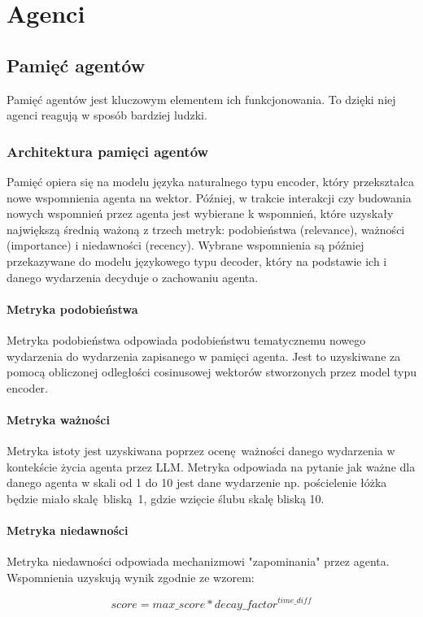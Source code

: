 \chapter{Agenci}

\section{Pamięć agentów}
Pamięć agentów jest kluczowym elementem ich funkcjonowania.
To dzięki niej agenci reagują w sposób bardziej ludzki.

\subsection{Architektura pamięci agentów}
Pamięć opiera się na modelu języka naturalnego typu encoder, który przekształca
nowe wspomnienia agenta na wektor. Później, w trakcie interakcji czy budowania nowych
wspomnień przez agenta jest wybierane k wspomnień, które uzyskały największą średnią
ważoną z trzech metryk: podobieństwa (relevance), ważności (importance) i niedawności (recency).
Wybrane wspomnienia są później przekazywane do modelu językowego typu decoder, który na
podstawie ich i danego wydarzenia decyduje o zachowaniu agenta.

\subsubsection{Metryka podobieństwa}
Metryka podobieństwa odpowiada podobieństwu tematycznemu nowego wydarzenia do
wydarzenia zapisanego w pamięci agenta. Jest to uzyskiwane za pomocą obliczonej
odległości cosinusowej wektorów stworzonych przez model typu encoder.

\subsubsection{Metryka ważności}
Metryka istoty jest uzyskiwana
poprzez ocenę ważności danego wydarzenia w kontekście życia agenta przez LLM.
Metryka odpowiada na pytanie jak ważne dla danego agenta w skali od 1 do 10 jest
dane wydarzenie np. pościelenie łóżka będzie miało skalę bliską 1, gdzie wzięcie
ślubu skalę bliską 10.

\subsubsection{Metryka niedawności}
Metryka niedawności odpowiada mechanizmowi "zapominania" przez agenta.
Wspomnienia uzyskują wynik zgodnie ze wzorem:

\begin{equation}
	score = max\_score * decay\_factor ^ {time\_diff}
\end{equation}

